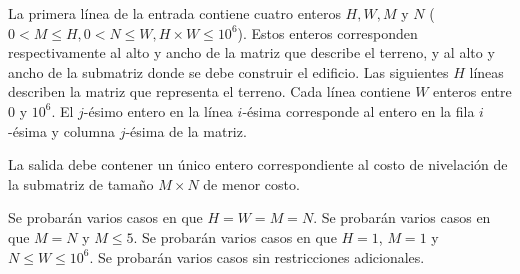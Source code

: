 \documentclass{oci}
\begin{document}
\begin{inputDescription}
  La primera línea de la entrada contiene cuatro enteros $H, W, M$ y $N$
  ($0 < M \leq H, 0 < N \leq W, H\times W \leq 10^6$).
  Estos enteros corresponden respectivamente al alto y ancho de la matriz que describe el terreno,
  y al alto y ancho de la submatriz donde se debe construir el edificio.
  Las siguientes $H$ líneas describen la matriz que representa el terreno.
  Cada línea contiene $W$ enteros entre 0 y $10^6$.
  El $j$-ésimo entero en la línea $i$-ésima corresponde al entero en la fila $i$-ésima y
  columna $j$-ésima de la matriz.
\end{inputDescription}

\begin{outputDescription}
  La salida debe contener un único entero correspondiente al costo de nivelación de la submatriz
  de tamaño $M\times N$ de menor costo.
\end{outputDescription}


\begin{scoreDescription}
  Se probarán varios casos en que $H=W=M=N$.
  Se probarán varios casos en que $M=N$ y $M\leq 5$.
  Se probarán varios casos en que $H=1$, $M=1$ y $N \leq W \leq 10^6$.
  Se probarán varios casos sin restricciones adicionales.
\end{scoreDescription}

\begin{sampleDescription}
\end{sampleDescription}
\end{document}
